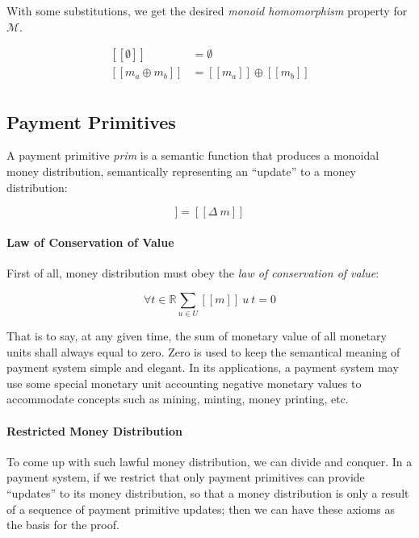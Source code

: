 With some substitutions, we get the desired \textit{monoid homomorphism} property for $\mathcal{M}$.

\begin{equation}
    \begin{split}
        [\![\emptyset]\!] &= \emptyset \\
        [\![m_a \oplus m_b]\!] &= [\![m_a]\!] \oplus [\![m_b]\!] \\
    \end{split}
\end{equation}

\subsection{Payment Primitives}

A payment primitive \textit{prim} is a semantic function that produces a monoidal money distribution, semantically
representing an ``update'' to a money distribution:

\begin{equation}
    [\![prim\ args]\!] = [\![\Delta\ m]\!]
\end{equation}

\paragraph{Law of Conservation of Value}

First of all, money distribution must obey the \textit{law of conservation of value}:

\begin{equation}
    \forall t \in \mathbb{R} {\displaystyle \sum_{u \in U} [\![m]\!]\ u\ t = 0}
\end{equation}

That is to say, at any given time, the sum of monetary value of all monetary units shall always equal to zero. Zero is
used to keep the semantical meaning of payment system simple and elegant. In its applications, a payment system may use
some special monetary unit accounting negative monetary values to accommodate concepts such as mining, minting, money
printing, etc.

\paragraph{Restricted Money Distribution}

To come up with such lawful money distribution, we can divide and conquer. In a payment system, if we restrict that only
payment primitives can provide ``updates'' to its money distribution, so that a money distribution is only a result of a
sequence of payment primitive updates; then we can have these axioms as the basis for the proof.

